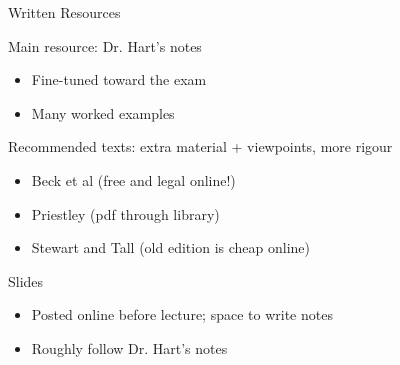 \documentclass{beamer}
\begin{document}
    \begin{frame}[plain]
     \end{frame}



\begin{frame}{Written Resources}
\begin{block}{Main resource: Dr. Hart's notes}
\begin{itemize}
\item  Fine-tuned toward the exam
\item Many worked examples
\end{itemize}
\end{block}

\begin{block}{Recommended texts: extra material + viewpoints, more rigour}
\begin{itemize}
\item Beck et al (free and legal online!)
\item Priestley (pdf through library)
\item Stewart and Tall (old edition is cheap online)
\end{itemize}
\end{block}

\begin{block}{Slides}
\begin{itemize}
\item Posted online before lecture; space to write notes
\item Roughly follow Dr. Hart's notes
\end{itemize}
\end{block}
\end{frame}
\end{document}
